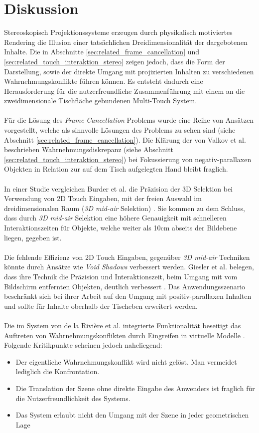 \section{Diskussion}
\label{sec:diskussion_wahrnehmungskonflikte}

Stereoskopisch Projektionssysteme erzeugen durch physikalisch motiviertes Rendering die Illusion einer tatsächlichen Dreidimensionalität der dargebotenen Inhalte. Die in Abschnitte \ref{sec:related_frame_cancellation} und \ref{sec:related_touch_interaktion_stereo} zeigen jedoch, dass die Form der Darstellung, sowie der direkte Umgang mit projizierten Inhalten zu verschiedenen Wahrnehmungskonflikte führen können. Es entsteht dadurch eine Herausforderung für die nutzerfreundliche Zusammenführung mit einem an die zweidimensionale Tischfläche gebundenen Multi-Touch System. 
\\\\
Für die Lösung des \emph{Frame Cancellation} Problems wurde eine Reihe von Ansätzen vorgestellt, welche als sinnvolle Lösungen des Problems zu sehen sind (siehe Abschnitt \ref{sec:related_frame_cancellation}). Die Klärung der von Valkov et al. beschrieben Wahrnehmungsdiskrepanz (siehe Abschnitt \ref{sec:related_touch_interaktion_stereo}) bei Fokussierung von negativ-parallaxen Objekten in Relation zur auf dem Tisch aufgelegten Hand bleibt fraglich.
\\\\
In einer Studie vergleichen Burder et al. die Präzision der 3D Selektion bei Verwendung von 2D Touch Eingaben, mit der freien Auswahl im dreidimensionalen Raum (\emph{3D mid-air} Selektion) \cite{bruder:2013}. Sie kommen zu dem Schluss, dass durch \emph{3D mid-air} Selektion eine höhere Genauigkeit mit schnelleren Interaktionszeiten für Objekte, welche weiter als 10cm abseits der Bildebene liegen, gegeben ist.
\\\\
Die fehlende Effizienz von 2D Touch Eingaben, gegenüber \emph{3D mid-air} Techniken könnte durch Ansätze wie \emph{Void Shadows} verbessert werden. Giesler et al. belegen, dass ihre Technik die Präzision und Interaktionszeit, beim Umgang mit vom Bildschirm entfernten Objekten, deutlich verbessert \cite{giesler:2014}. Das Anwendungsszenario beschränkt sich bei ihrer Arbeit auf den Umgang mit positiv-parallaxen Inhalten und sollte für Inhalte oberhalb der Tischeben erweitert werden.
\\\\
Die im System von de la Rivière et al. integrierte Funktionalität beseitigt das Auftreten von Wahrnehmungskonflikten durch Eingreifen in virtuelle Modelle \cite{delariviere:2010}. Folgende Kritikpunkte scheinen jedoch naheliegend:

\begin{itemize}
	\item Der eigentliche Wahrnehmungskonflikt wird nicht gelöst. Man vermeidet lediglich die Konfrontation.
	\item Die Translation der Szene ohne direkte Eingabe des Anwenders ist fraglich für die Nutzerfreundlichkeit des Systems.
	\item Das System erlaubt nicht den Umgang mit der Szene in jeder geometrischen Lage
\end{itemize}